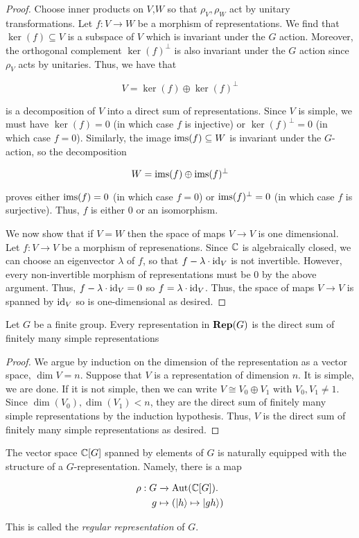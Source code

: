 \begin{proof}Choose inner products on $V$,$W$ so that $\rho_V,\rho_W$ act by unitary transformations. Let $f:V\to W$ be a morphism of representations. We find that $\ker(f)\subseteq V$ is a subspace of $V$ which is invariant under the $G$ action. Moreover, the orthogonal complement $\ker(f)^\perp$ is also invariant under the $G$ action since $\rho_V$ acts by unitaries. Thus, we have that

$$V=\ker(f)\oplus \ker(f)^\perp$$

is a decomposition of $V$ into a direct sum of representations. Since $V$ is simple, we must have $\ker(f)=0$ (in which case $f$ is injective) or $\ker(f)^\perp=0$ (in which case $f=0$). Similarly, the image $\operatorname{ims}(f)\subseteq W$ is invariant under the $G$-action, so the decomposition 

$$W=\operatorname{ims}(f)\oplus \operatorname{ims}(f)^\perp$$

proves either $\operatorname{ims}(f)=0$ (in which case $f=0$) or $\operatorname{ims}(f)^\perp=0$ (in which case $f$ is surjective). Thus, $f$ is either $0$ or an isomorphism.

We now show that if $V=W$ then the space of maps $V\to V$ is one dimensional. Let $f:V\to V$ be a morphism of represenations. Since ${\mathbb C}$ is algebraically closed, we can choose an eigenvector $\lambda$ of $f$, so that $f-\lambda\cdot \operatorname{id}_V$ is not invertible. However, every non-invertible morphism of representations must be 0 by the above argument. Thus, $f-\lambda\cdot \operatorname{id}_V=0$ so $f=\lambda\cdot \operatorname{id}_V$. Thus, the space of maps $V\to V$ is spanned by $\operatorname{id}_V$ so is one-dimensional as desired.
\end{proof}

\begin{prop}\label{mashke-theorem} Let $G$ be a finite group. Every representation in ${\bf Rep}(G)$ is the direct sum of finitely many simple representations
\end{prop}
\begin{proof}We argue by induction on the dimension of the representation as a vector space, $\dim V =n$. Suppose that $V$ is a representation of dimension $n$. It is simple, we are done. If it is not simple, then we can write $V\cong V_0\oplus V_1$ with $V_0,V_1\neq 1$. Since $\dim(V_0),\dim(V_1)<n$, they are the direct sum of finitely many simple representations by the induction hypothesis. Thus, $V$ is the direct sum of finitely many simple representations as desired.
\end{proof}

\begin{ex}
The vector space ${\mathbb C}[G]$ spanned by elements of $G$ is naturally equipped with the structure of a $G$-representation. Namely, there is a map

\begin{align*}
\rho:G&\xrightarrow{}\operatorname{Aut}({\mathbb C}[G]).\\
g&\mapsto (\ket{h}\mapsto \ket{gh})
\end{align*}

This is called the {\em regular representation} of $G$.
\end{ex}


